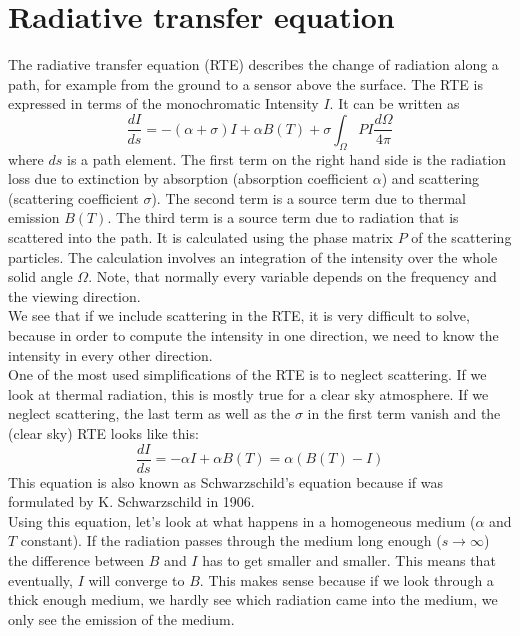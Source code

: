 \documentclass[a4paper,fleqn]{article}
\begin{document}
\section{Radiative transfer equation}
The radiative transfer equation (RTE) describes the change of radiation along a path,
for example from the ground to a sensor above the surface. The RTE is expressed in 
terms of the monochromatic Intensity $I$. It can be written as
\begin{equation}
	\frac{dI}{ds} = - (\alpha + \sigma)I + \alpha B(T) + \sigma \int_\Omega PI 
	\frac{d\Omega}{4\pi}
\end{equation}
where $ds$ is a path element. The first term on the right hand side is 
the radiation loss due to extinction by absorption (absorption coefficient $\alpha$) 
and scattering (scattering coefficient $\sigma$). The second term is a source term
due to thermal emission $B(T)$. The third term is a source term due to radiation that
is scattered into the path. It is calculated using the phase matrix $P$ of the 
scattering particles. The calculation involves an integration of the intensity over the 
whole solid angle $\Omega$. Note, that normally every variable depends on the frequency
and the viewing direction. \\
We see that if we include scattering in the RTE, it is very difficult to solve, because 
in order to compute the intensity in one direction, we need to know the intensity in 
every other direction.\\
One of the most used simplifications of the RTE is to neglect scattering. If we look at
thermal radiation, this is mostly true for a clear sky atmosphere. If we neglect 
scattering, the last term as well as the $\sigma$ in the first term vanish and the 
(clear sky) RTE looks like this:
\begin{equation}
	\frac{dI}{ds} = -\alpha I + \alpha B(T) = \alpha ( B(T) - I )
\end{equation}
This equation is also known as Schwarzschild's equation because if was formulated by 
K. Schwarzschild in 1906.\\
Using this equation, let's look at what happens in a homogeneous medium ($\alpha$ and $T$
constant). If the radiation passes through the medium long enough ($s \rightarrow \infty$)
the difference between $B$ and $I$ has to get smaller and smaller. This means that eventually,
$I$ will converge to $B$. This makes sense because if we look through a thick enough medium, 
we hardly see which radiation came into the medium, we only see the emission of the medium.\\
\end{document}

